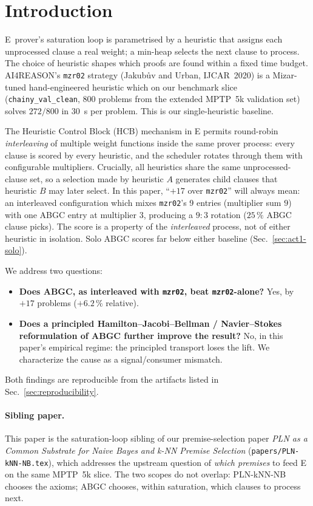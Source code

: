 \documentclass[11pt]{article}
\newcommand{\lpath}[1]{\texttt{\nolinkurl{#1}}}
\begin{document}
\tableofcontents

\section{Introduction}

E~prover's saturation loop is parametrised by a heuristic that assigns each
unprocessed clause a real weight; a min-heap selects the next clause to
process. The choice of heuristic shapes which proofs are found within a
fixed time budget. AI4REASON's \texttt{mzr02} strategy (Jakub\r{u}v and
Urban, IJCAR~2020) is a Mizar-tuned hand-engineered heuristic which on our
benchmark slice (\lpath{chainy_val_clean}, 800 problems from
the extended MPTP~5k validation set) solves $272/800$ in $30$~s per problem.
This is our single-heuristic baseline.

The Heuristic Control Block (HCB) mechanism in E permits round-robin
\emph{interleaving} of multiple weight functions inside the same prover
process: every clause is scored by every heuristic, and the scheduler
rotates through them with configurable multipliers. Crucially, all
heuristics share the same unprocessed-clause set, so a selection made by
heuristic $A$ generates child clauses that heuristic $B$ may later select.
In this paper, ``$+17$ over \texttt{mzr02}'' will always mean: an
interleaved configuration which mixes \texttt{mzr02}'s 9 entries (multiplier
sum $9$) with one ABGC entry at multiplier $3$, producing a $9{:}3$ rotation
($25\,\%$ ABGC clause picks). The score is a property of the \emph{interleaved}
process, not of either heuristic in isolation. Solo ABGC scores far below
either baseline (Sec.~\ref{sec:act1-solo}).

We address two questions:
\begin{itemize}
\item \textbf{Does ABGC, as interleaved with \texttt{mzr02}, beat \texttt{mzr02}-alone?}
      Yes, by $+17$ problems ($+6.2\,\%$ relative).
\item \textbf{Does a principled Hamilton--Jacobi--Bellman / Navier--Stokes
      reformulation of ABGC further improve the result?}
      No, in this paper's empirical regime: the principled transport
      loses the lift. We characterize the cause as a signal/consumer mismatch.
\end{itemize}

Both findings are reproducible from the artifacts listed in
Sec.~\ref{sec:reproducibility}.

\paragraph{Sibling paper.}
This paper is the saturation-loop sibling of our premise-selection paper
\emph{PLN as a Common Substrate for Naive Bayes and k-NN Premise Selection}
(\lpath{papers/PLN-kNN-NB.tex}), which addresses the upstream question of
\emph{which premises} to feed E on the same MPTP~5k slice. The two scopes
do not overlap: PLN-kNN-NB chooses the axioms; ABGC chooses, within
saturation, which clauses to process next.
\end{document}
